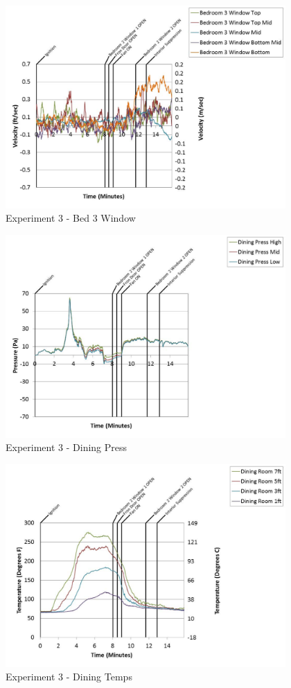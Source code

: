 \documentclass{article}
\begin{document}
\begin{appendices}
	\clearpage

	\begin{figure}[h!]
		\centering
		\includegraphics[height=3.05in]{0_Images/Results_Charts/Exp_3_Charts/Bed3Window.pdf}
		\caption{Experiment 3 - Bed 3 Window}
	\end{figure}
 

	\begin{figure}[h!]
		\centering
		\includegraphics[height=3.05in]{0_Images/Results_Charts/Exp_3_Charts/DiningPress.pdf}
		\caption{Experiment 3 - Dining Press}
	\end{figure}
 
	\clearpage

	\begin{figure}[h!]
		\centering
		\includegraphics[height=3.05in]{0_Images/Results_Charts/Exp_3_Charts/DiningTemps.pdf}
		\caption{Experiment 3 - Dining Temps}
	\end{figure}
 


\end{appendices}
\end{document}
